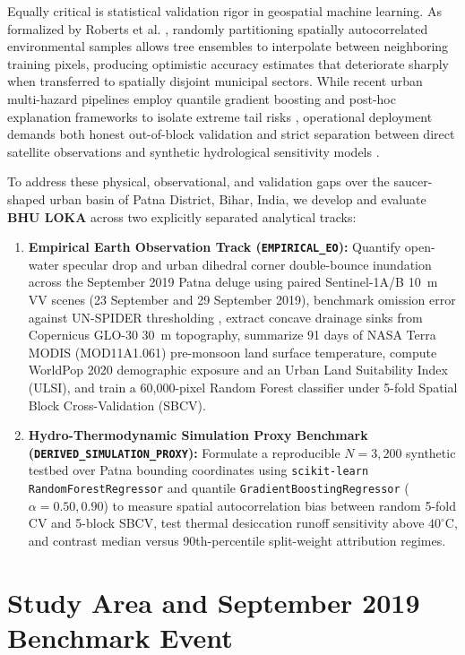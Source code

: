 \documentclass[OA,linenum]{InterPore}
\begin{document}
Equally critical is statistical validation rigor in geospatial machine learning. As formalized by Roberts et al. \cite{Roberts2017}, randomly partitioning spatially autocorrelated environmental samples allows tree ensembles to interpolate between neighboring training pixels, producing optimistic accuracy estimates that deteriorate sharply when transferred to spatially disjoint municipal sectors. While recent urban multi-hazard pipelines employ quantile gradient boosting and post-hoc explanation frameworks to isolate extreme tail risks \cite{Singh2026}, operational deployment demands both honest out-of-block validation and strict separation between direct satellite observations and synthetic hydrological sensitivity models \cite{Boni2025, Pittore2023}.

To address these physical, observational, and validation gaps over the saucer-shaped urban basin of Patna District, Bihar, India, we develop and evaluate \textbf{BHU LOKA} across two explicitly separated analytical tracks:
\begin{enumerate}
    \item \textbf{Empirical Earth Observation Track (\texttt{EMPIRICAL\_EO}):} Quantify open-water specular drop and urban dihedral corner double-bounce inundation across the September 2019 Patna deluge using paired Sentinel-1A/B 10~m VV scenes (23 September and 29 September 2019), benchmark omission error against UN-SPIDER thresholding \cite{MapAction2024}, extract concave drainage sinks from Copernicus GLO-30 30~m topography, summarize 91 days of NASA Terra MODIS (MOD11A1.061) pre-monsoon land surface temperature, compute WorldPop 2020 demographic exposure and an Urban Land Suitability Index (ULSI), and train a 60,000-pixel Random Forest classifier under 5-fold Spatial Block Cross-Validation (SBCV).
    \item \textbf{Hydro-Thermodynamic Simulation Proxy Benchmark (\texttt{DERIVED\_SIMULATION\_PROXY}):} Formulate a reproducible $N = 3,200$ synthetic testbed over Patna bounding coordinates using \texttt{scikit-learn} \cite{Pedregosa2011} \texttt{RandomForestRegressor} and quantile \texttt{GradientBoostingRegressor} ($\alpha = 0.50, 0.90$) to measure spatial autocorrelation bias between random 5-fold CV and 5-block SBCV, test thermal desiccation runoff sensitivity above $40^\circ\text{C}$, and contrast median versus 90th-percentile split-weight attribution regimes.
\end{enumerate}

\section{Study Area and September 2019 Benchmark Event}
\end{document}
